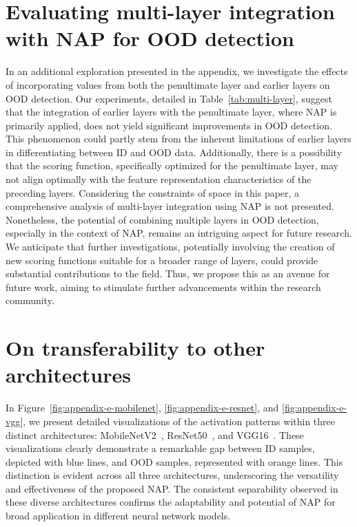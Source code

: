 \section{Evaluating multi-layer integration with NAP for OOD detection}
\label{appendix:integration}
In an additional exploration presented in the appendix, we investigate the effects of incorporating values from both the penultimate layer and earlier layers on OOD detection. Our experiments, detailed in Table~\ref{tab:multi-layer}, suggest that the integration of earlier layers with the penultimate layer, where NAP is primarily applied, does not yield significant improvements in OOD detection. This phenomenon could partly stem from the inherent limitations of earlier layers in differentiating between ID and OOD data. Additionally, there is a possibility that the scoring function, specifically optimized for the penultimate layer, may not align optimally with the feature representation characteristics of the preceding layers. Considering the constraints of space in this paper, a comprehensive analysis of multi-layer integration using NAP is not presented. Nonetheless, the potential of combining multiple layers in OOD detection, especially in the context of NAP, remains an intriguing aspect for future research. We anticipate that further investigations, potentially involving the creation of new scoring functions suitable for a broader range of layers, could provide substantial contributions to the field. Thus, we propose this as an avenue for future work, aiming to stimulate further advancements within the research community.
\section{On transferability to other architectures}
\label{appendix:transfer}
In Figure~\ref{fig:appendix-e-mobilenet}, \ref{fig:appendix-e-resnet}, and \ref{fig:appendix-e-vgg}, we present detailed visualizations of the activation patterns within three distinct architectures: MobileNetV2~\cite{sandler2018mobilenetv2}, ResNet50~\cite{he2016deep}, and VGG16~\cite{simonyan2015very}. These visualizations clearly demonstrate a remarkable gap between ID samples, depicted with blue lines, and OOD samples, represented with orange lines. This distinction is evident across all three architectures, underscoring the versatility and effectiveness of the proposed NAP. The consistent separability observed in these diverse architectures confirms the adaptability and potential of NAP for broad application in different neural network models.

